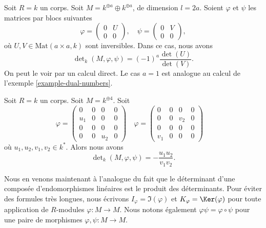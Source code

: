 \begin{example}
\label{example-special-vector-space}
Soit $R = k$ un corps.
Soit $M = k^{\oplus a} \oplus k^{\oplus a}$, de dimension $l = 2a$.
Soient $\varphi$ et $\psi$ les matrices par blocs suivantes
$$
\varphi =
\left(
\begin{matrix}
0 & U \\
0 & 0
\end{matrix}
\right),
\quad
\psi =
\left(
\begin{matrix}
0 & V \\
0 & 0
\end{matrix}
\right),
$$
où $U, V \in \text{Mat}(a \times a, k)$ sont inversibles.
Dans ce cas, nous avons
$$
\det\nolimits_k(M, \varphi, \psi)
=
(-1)^a\frac{\det(U)}{\det(V)}.
$$
On peut le voir par un calcul direct.
Le cas $a = 1$ est analogue au calcul de
l'exemple \ref{example-dual-numbers}.
\end{example}

\begin{example}
\label{example-a-la-oort}
Soit $R = k$ un corps.
Soit $M = k^{\oplus 4}$.
Soit
$$
\varphi =
\left(
\begin{matrix}
  0 &   0 &   0 &   0 \\
u_1 &   0 &   0 &   0 \\
  0 &   0 &   0 &   0 \\
  0 &   0 & u_2 &   0
\end{matrix}
\right)
\quad
\varphi =
\left(
\begin{matrix}
  0 &   0 &   0 &   0 \\
  0 &   0 & v_2 &   0 \\
  0 &   0 &   0 &   0 \\
v_1 &   0 &   0 &   0
\end{matrix}
\right)
\quad
$$
où $u_1, u_2, v_1, v_2 \in k^*$.
Alors nous avons
$$
\det\nolimits_k(M, \varphi, \psi) = -\frac{u_1u_2}{v_1v_2}.
$$
\end{example}

\noindent
Nous en venons maintenant à l'analogue du fait que le déterminant
d'une composée d'endomorphismes linéaires est le produit des
déterminants. Pour éviter des formules très longues, nous
écrivons $I_\varphi = \Im(\varphi)$ et
$K_\varphi = \Ker(\varphi)$
pour toute application de $R$-modules $\varphi : M \to M$.
Nous notons également $\varphi\psi = \varphi \circ \psi$
pour une paire de morphismes $\varphi, \psi : M \to M$.

